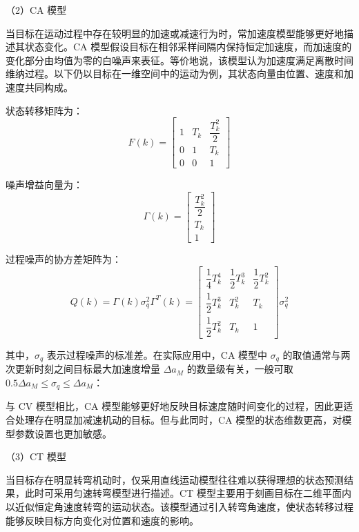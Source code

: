 \documentclass{xdupgthesis}
\begin{document}
\textnormal{（2）CA 模型}\par\vspace{0.3\baselineskip}

当目标在运动过程中存在较明显的加速或减速行为时，常加速度模型能够更好地描述其状态变化。CA 模型假设目标在相邻采样间隔内保持恒定加速度，而加速度的变化部分由均值为零的白噪声来表征。等价地说，该模型认为加速度满足离散时间维纳过程。以下仍以目标在一维空间中的运动为例，其状态向量由位置、速度和加速度共同构成。

状态转移矩阵为：
\begin{equation}
	F(k)=
	\begin{bmatrix}
		1 & T_k & \dfrac{T_k^2}{2}\\
		0 & 1   & T_k\\
		0 & 0   & 1
	\end{bmatrix}
\end{equation}

噪声增益向量为：
\begin{equation}
	\Gamma(k)=
	\begin{bmatrix}
		\dfrac{T_k^2}{2}\\
		T_k\\
		1
	\end{bmatrix}
\end{equation}

过程噪声的协方差矩阵为：
\begin{equation}
	Q(k)=\Gamma(k)\sigma_q^2\Gamma^{T}(k)=
	\begin{bmatrix}
		\dfrac{1}{4}T_k^4 & \dfrac{1}{2}T_k^3 & \dfrac{1}{2}T_k^2\\[6pt]
		\dfrac{1}{2}T_k^3 & T_k^2 & T_k\\[6pt]
		\dfrac{1}{2}T_k^2 & T_k & 1
	\end{bmatrix}\sigma_q^2
\end{equation}

其中，$\sigma_q$ 表示过程噪声的标准差。在实际应用中，CA 模型中 $\sigma_q$ 的取值通常与两次更新时刻之间目标最大加速度增量 $\Delta a_M$ 的数量级有关，一般可取\(0.5\Delta a_M \leq \sigma_q \leq \Delta a_M\)\cite{barshalom2004estimation}：

与 CV 模型相比，CA 模型能够更好地反映目标速度随时间变化的过程，因此更适合处理存在明显加减速机动的目标。但与此同时，CA 模型的状态维数更高，对模型参数设置也更加敏感。

\textnormal{（3）CT 模型}\par\vspace{0.3\baselineskip}

当目标存在明显转弯机动时，仅采用直线运动模型往往难以获得理想的状态预测结果，此时可采用匀速转弯模型进行描述。CT 模型主要用于刻画目标在二维平面内以近似恒定角速度转弯的运动状态。该模型通过引入转弯角速度，使状态转移过程能够反映目标方向变化对位置和速度的影响。
\end{document}
